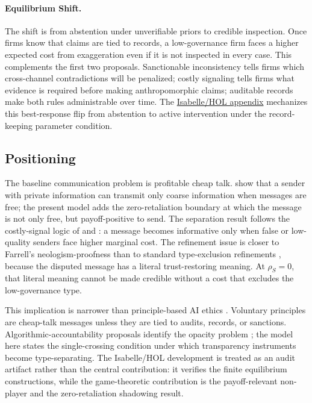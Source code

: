 \documentclass[review,authoryear]{elsarticle}
\theoremstyle{definition}
\theoremstyle{plain}
\begin{document}
\paragraph{Equilibrium Shift.}
The shift is from abstention under unverifiable priors to credible inspection.
Once firms know that claims are tied to records, a low-governance firm faces a
higher expected cost from exaggeration even if it is not inspected in every
case. This complements the first two proposals. Sanctionable inconsistency tells
firms which cross-channel contradictions will be penalized; costly signaling
tells firms what evidence is required before making anthropomorphic claims;
auditable records make both rules administrable over time. The \hyperref[app:isabelle]{Isabelle/HOL appendix} mechanizes this best-response flip from abstention to active intervention under the record-keeping parameter condition.

\subsection{Positioning}
\label{subsec:positioning}

The baseline communication problem is profitable cheap talk.  \citet{crawford_sobel1982}
show that a sender with private information can transmit only coarse information
when messages are free; the present model adds the zero-retaliation boundary at which the message is not only free, but payoff-positive to send.  The separation result follows the costly-signal logic
of \citet{spence1973} and \citet{milgrom_roberts1986}: a message becomes
informative only when false or low-quality senders face higher marginal cost.
The refinement issue is closer to Farrell's neologism-proofness
\citep{farrell1993} than to standard type-exclusion refinements
\citep{cho_kreps1987,banks_sobel1987}, because the disputed message has a
literal trust-restoring meaning.  At $\rho_S=0$, that literal meaning cannot be
made credible without a cost that excludes the low-governance type.

This implication is narrower than principle-based AI ethics
\citep{floridi2018ai4people,jobin2019global}.  Voluntary principles are
cheap-talk messages unless they are tied to audits, records, or
sanctions.  Algorithmic-accountability proposals identify the opacity problem
\citep{pasquale2015}; the model here states the single-crossing condition under
which transparency instruments become type-separating.  The Isabelle/HOL
development is treated as an audit artifact rather than the central
contribution: it verifies the finite equilibrium constructions, while the
game-theoretic contribution is the payoff-relevant non-player and the
zero-retaliation shadowing result.
\end{document}
